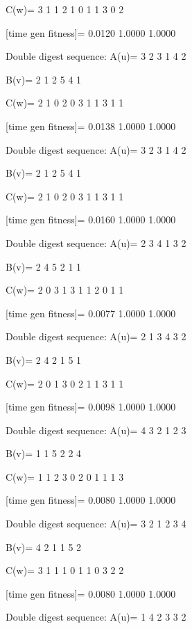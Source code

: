 C(w)=
     3     1     1     2     1     0     1     1     3     0     2

[time gen fitness]=
    0.0120    1.0000    1.0000

Double digest sequence:
A(u)=
     3     2     3     1     4     2

B(v)=
     2     1     2     5     4     1

C(w)=
     2     1     0     2     0     3     1     1     3     1     1

[time gen fitness]=
    0.0138    1.0000    1.0000

Double digest sequence:
A(u)=
     3     2     3     1     4     2

B(v)=
     2     1     2     5     4     1

C(w)=
     2     1     0     2     0     3     1     1     3     1     1

[time gen fitness]=
    0.0160    1.0000    1.0000

Double digest sequence:
A(u)=
     2     3     4     1     3     2

B(v)=
     2     4     5     2     1     1

C(w)=
     2     0     3     1     3     1     1     2     0     1     1

[time gen fitness]=
    0.0077    1.0000    1.0000

Double digest sequence:
A(u)=
     2     1     3     4     3     2

B(v)=
     2     4     2     1     5     1

C(w)=
     2     0     1     3     0     2     1     1     3     1     1

[time gen fitness]=
    0.0098    1.0000    1.0000

Double digest sequence:
A(u)=
     4     3     2     1     2     3

B(v)=
     1     1     5     2     2     4

C(w)=
     1     1     2     3     0     2     0     1     1     1     3

[time gen fitness]=
    0.0080    1.0000    1.0000

Double digest sequence:
A(u)=
     3     2     1     2     3     4

B(v)=
     4     2     1     1     5     2

C(w)=
     3     1     1     1     0     1     1     0     3     2     2

[time gen fitness]=
    0.0080    1.0000    1.0000

Double digest sequence:
A(u)=
     1     4     2     3     3     2

